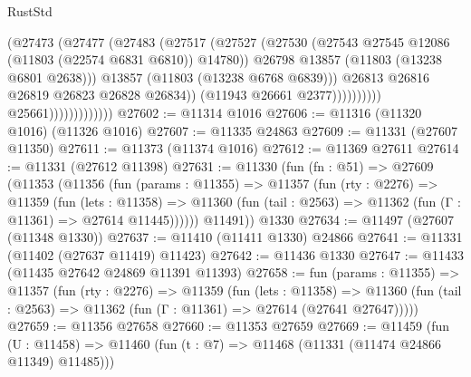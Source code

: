 \begin{lexlean}{RustStd}
\begin{coremodule}
                                              (@27473
                                                (@27477
                                                  (@27483
                                                    (@27517
                                                      (@27527
                                                        (@27530
                                                          (@27543
                                                            @27545
                                                            @12086
                                                            (@11803 (@22574 @6831 @6810))
                                                            @14780))
                                                        @26798
                                                        @13857
                                                        (@11803 (@13238 @6801 @2638)))
                                                      @13857
                                                      (@11803 (@13238 @6768 @6839)))
                                                    @26813
                                                    @26816
                                                    @26819
                                                    @26823
                                                    @26828
                                                    @26834))
                                                (@11943 @26661 @2377))))))))))
                              @25661)))))))))))))
@27602 := @11314 @1016
@27606 := @11316 (@11320 @1016) (@11326 @1016)
@27607 := @11335 @24863
@27609 := @11331 (@27607 @11350)
@27611 := @11373 (@11374 @1016)
@27612 := @11369 @27611
@27614 := @11331 (@27612 @11398)
@27631 := @11330
    (fun (fn : @51) =>
    @27609
      (@11353
        (@11356
          (fun (params : @11355) =>
          @11357
            (fun (rty : @2276) =>
            @11359
              (fun (lets : @11358) =>
              @11360 (fun (tail : @2563) => @11362 (fun (Γ : @11361) => @27614 @11445))))))
        @11491))
    @1330
@27634 := @11497 (@27607 (@11348 @1330))
@27637 := @11410 (@11411 @1330) @24866
@27641 := @11331 (@11402 (@27637 @11419) @11423)
@27642 := @11436 @1330
@27647 := @11433 (@11435 @27642 @24869 @11391 @11393)
@27658 := fun (params : @11355) =>
  @11357
    (fun (rty : @2276) =>
    @11359
      (fun (lets : @11358) =>
      @11360 (fun (tail : @2563) => @11362 (fun (Γ : @11361) => @27614 (@27641 @27647)))))
@27659 := @11356 @27658
@27660 := @11353 @27659
@27669 := @11459
    (fun (U : @11458) => @11460 (fun (t : @7) => @11468 (@11331 (@11474 @24866 @11349) @11485)))

\end{coremodule}
\end{lexlean}

